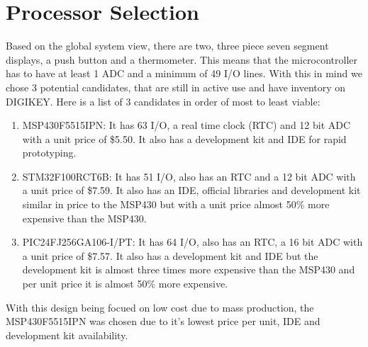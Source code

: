\section{Processor Selection}
Based on the global system view, there are two, three piece seven segment displays, a push button and a thermometer. This means that the microcontroller has to have at least 1 ADC and a minimum of 49 I/O lines. With this in mind we chose 3 potential candidates, that are still in active use and have inventory on DIGIKEY. Here is a list of 3 candidates in order of most to least viable:
\begin{enumerate}
  \item MSP430F5515IPN: It has 63 I/O, a real time clock (RTC) and 12 bit ADC with a unit price of \$5.50. It also has a development kit and IDE for rapid prototyping.
  \item STM32F100RCT6B: It has 51 I/O, also has an RTC and a 12 bit ADC with a unit price of \$7.59. It also has an IDE, official libraries and development kit similar in price to the MSP430 but with a unit price almost 50\% more expensive than the MSP430.
  \item PIC24FJ256GA106-I/PT: It has 64 I/O, also has an RTC, a 16 bit ADC with a unit price of \$7.57. It also has a development kit and IDE but the development kit is almost three times more expensive than the MSP430 and per unit price it is almost 50\% more expensive.
\end{enumerate}
With this design being focued on low cost due to mass production, the MSP430F5515IPN was chosen due to it's lowest price per unit, IDE and development kit availability.

